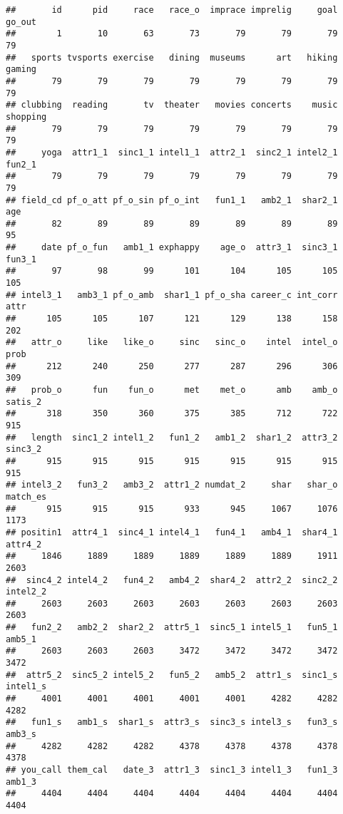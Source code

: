 \documentclass[]{article}
\begin{document}
\begin{verbatim}
##       id      pid     race   race_o  imprace imprelig     goal   go_out 
##        1       10       63       73       79       79       79       79 
##   sports tvsports exercise   dining  museums      art   hiking   gaming 
##       79       79       79       79       79       79       79       79 
## clubbing  reading       tv  theater   movies concerts    music shopping 
##       79       79       79       79       79       79       79       79 
##     yoga  attr1_1  sinc1_1 intel1_1  attr2_1  sinc2_1 intel2_1   fun2_1 
##       79       79       79       79       79       79       79       79 
## field_cd pf_o_att pf_o_sin pf_o_int   fun1_1   amb2_1  shar2_1      age 
##       82       89       89       89       89       89       89       95 
##     date pf_o_fun   amb1_1 exphappy    age_o  attr3_1  sinc3_1   fun3_1 
##       97       98       99      101      104      105      105      105 
## intel3_1   amb3_1 pf_o_amb  shar1_1 pf_o_sha career_c int_corr     attr 
##      105      105      107      121      129      138      158      202 
##   attr_o     like   like_o     sinc   sinc_o    intel  intel_o     prob 
##      212      240      250      277      287      296      306      309 
##   prob_o      fun    fun_o      met    met_o      amb    amb_o  satis_2 
##      318      350      360      375      385      712      722      915 
##   length  sinc1_2 intel1_2   fun1_2   amb1_2  shar1_2  attr3_2  sinc3_2 
##      915      915      915      915      915      915      915      915 
## intel3_2   fun3_2   amb3_2  attr1_2 numdat_2     shar   shar_o match_es 
##      915      915      915      933      945     1067     1076     1173 
## positin1  attr4_1  sinc4_1 intel4_1   fun4_1   amb4_1  shar4_1  attr4_2 
##     1846     1889     1889     1889     1889     1889     1911     2603 
##  sinc4_2 intel4_2   fun4_2   amb4_2  shar4_2  attr2_2  sinc2_2 intel2_2 
##     2603     2603     2603     2603     2603     2603     2603     2603 
##   fun2_2   amb2_2  shar2_2  attr5_1  sinc5_1 intel5_1   fun5_1   amb5_1 
##     2603     2603     2603     3472     3472     3472     3472     3472 
##  attr5_2  sinc5_2 intel5_2   fun5_2   amb5_2  attr1_s  sinc1_s intel1_s 
##     4001     4001     4001     4001     4001     4282     4282     4282 
##   fun1_s   amb1_s  shar1_s  attr3_s  sinc3_s intel3_s   fun3_s   amb3_s 
##     4282     4282     4282     4378     4378     4378     4378     4378 
## you_call them_cal   date_3  attr1_3  sinc1_3 intel1_3   fun1_3   amb1_3 
##     4404     4404     4404     4404     4404     4404     4404     4404 

\end{verbatim}
\end{document}
